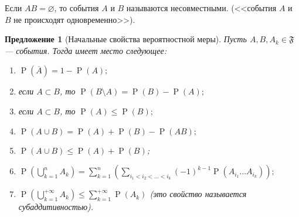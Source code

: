 \documentclass[12pt]{article}
\newtheorem{proposition}[theorem]{Предложение}
\numberwithin{theorem}{section}
\theoremstyle{definition}
\newcommand{\prob}{\operatorname{P}}
\newcommand{\defin}[2]{\hypertarget{#2}{{\color{red} #1}}}
\newcommand{\events}{\mathfrak{F}}
\begin{document}
	Если $ AB = \varnothing $, то события $ A $ и $ B $ называются \defin{несовместными}{}.
	(<<события $ A $ и $ B $ не происходят одновременно>>).
	
	\begin{proposition}[Начальные свойства вероятностной меры]
		Пусть $ A, B, A_k \in \events $ --- события.
		Тогда имеет место следующее:
		\begin{enumerate}
			\item $ \prob(\overline{A}) = 1 - \prob(A); $ \label{prob-prop1}
			\item если $ A \subset B $, то $ \prob(B \setminus A) = \prob(B) - \prob(A); $ \label{prob-prop2}
			\item если $ A \subset B $, то $ \prob(A) \leqslant \prob(B); $ \label{prob-prop2.5}
			\item $ \prob(A \cup B) = \prob(A) + \prob(B) - \prob(AB); $ \label{prob-prop3}
			\item $ \prob(A \cup B) \leqslant \prob(A) + \prob(B) $; \label{prob-prop4}
			\item $ \prob(\bigcup\limits_{k = 1}^{n} A_k) = \sum\limits_{k = 1}^{n} 
			\left(\sum\limits_{i_1 < i_2 < \ldots < i_k} (-1)^{k - 1}\prob(A_{i_1} \ldots A_{i_k})\right); $ \label{prob-prop5}
			\item $ \prob\left(\bigcup\limits_{k = 1}^{+\infty} A_k \right) \leqslant \sum\limits_{k = 1}^{+\infty} \prob(A_k) $ 
			(это свойство называется \defin{субаддитивностью}{subadditivity}). \label{prob-prop6}
		\end{enumerate}
	\end{proposition}
	
\end{document}
